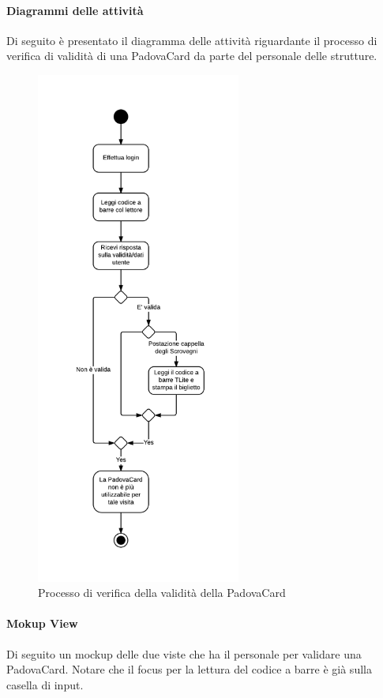 \paragraph{Diagrammi delle attività}
Di seguito è presentato il diagramma delle attività riguardante il processo di verifica di validità di una PadovaCard da parte del personale delle strutture.
\begin{figure}[H]
\centering
\includegraphics[width=0.6\textwidth]{images/validazione_padovacard.png}
\caption{Processo di verifica della validità della PadovaCard}
\end{figure}


\paragraph{Mokup View}
Di seguito un mockup delle due viste che ha il personale per validare una PadovaCard.
Notare che il focus per la lettura del codice a barre è già sulla casella di input.

